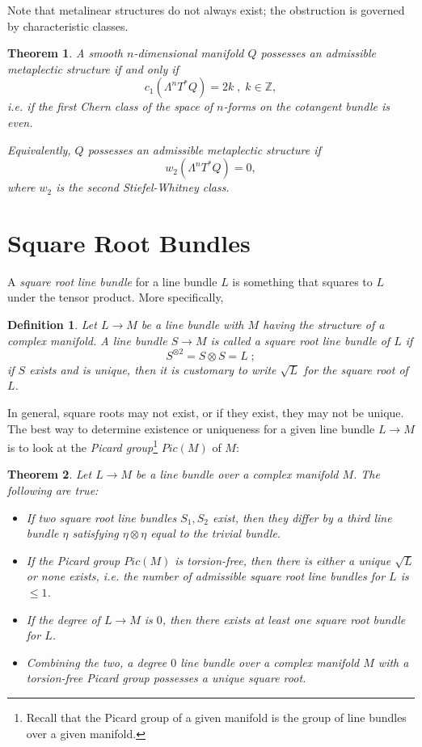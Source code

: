 \documentclass{tufte-handout}
\newtheorem{thrm}{Theorem} %
\newtheorem{defn}{Definition} %
\begin{document}
Note that metalinear structures do not always exist; the obstruction is governed by characteristic classes.
\begin{fullwidth}
\begin{thrm}
A smooth $n$-dimensional manifold $Q$ possesses an admissible metaplectic structure if and only if
$$
c_1(\Lambda^n T^* Q) = 2k \;,\; k \in \mathbb{Z},
$$
i.e. if the first Chern class of the space of $n$-forms on the cotangent bundle is even.

Equivalently, $Q$ possesses an admissible metaplectic structure if
$$
w_2(\Lambda^n T^* Q) = 0,
$$
where $w_2$ is the second Stiefel-Whitney class.
\end{thrm}
\end{fullwidth}

\section{Square Root Bundles}
A \emph{square root line bundle} for a line bundle $L$ is something that squares to $L$ under the tensor product. More specifically,
\begin{fullwidth}
\begin{defn}
Let $L \to M$ be a line bundle with $M$ having the structure of a complex manifold. A line bundle $S \to M$ is called a \emph{square root} line bundle of $L$ if
$$
S^{\otimes 2} = S \otimes S = L \; ;
$$
if $S$ exists and is unique, then it is customary to write $\sqrt{L}$ for the square root of $L$.
\end{defn}
\end{fullwidth}

In general, square roots may not exist, or if they exist, they may not be unique. The best way to determine existence or uniqueness for a given line bundle $L \to M$ is to look at the \emph{Picard group}\footnote{Recall that the Picard group of a given manifold is the group of line bundles over a given manifold.} $Pic(M)$ of $M$:

\begin{thrm}
Let $L \to M$ be a line bundle over a complex manifold $M$. The following are true:
\begin{itemize}
\item If two square root line bundles $S_1, S_2$ exist, then they differ by a third line bundle $\eta$ satisfying $\eta \otimes \eta$ equal to the trivial bundle.

\item If the Picard group $Pic(M)$ is \emph{torsion-free}, then there is either a unique $\sqrt{L}$ or none exists, i.e. the number of admissible square root line bundles for $L$ is $\leq 1$.

\item If the degree of $L \to M$ is $0$, then there exists at least one square root bundle for $L$.

\item Combining the two, a degree $0$ line bundle over a complex manifold $M$ with a torsion-free Picard group possesses a unique square root.
\end{itemize}
\end{thrm}
\end{document}
